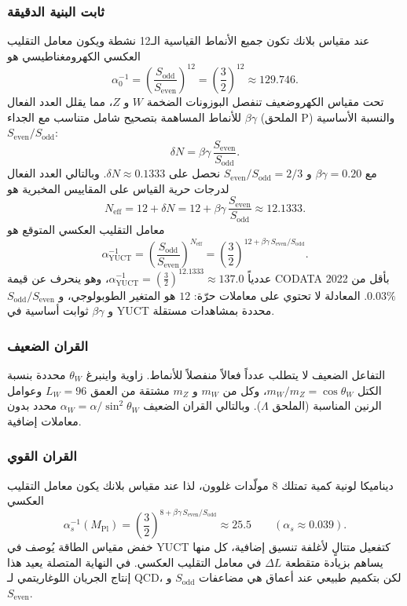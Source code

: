 \documentclass[12pt,a4paper]{article}
\begin{document}
	\subsubsection{ثابت البنية الدقيقة}
	عند مقياس بلانك تكون جميع الأنماط القياسية الـ12 نشطة ويكون معامل التقليب العكسي الكهرومغناطيسي هو
	\[
	\alpha_0^{-1} = \left(\frac{S_{\mathrm{odd}}}{S_{\mathrm{even}}}\right)^{12} = \left(\frac{3}{2}\right)^{12} \approx 129.746 .
	\]
	تحت مقياس الكهروضعيف تنفصل البوزونات الضخمة \(W\) و \(Z\)، مما يقلل العدد الفعال للأنماط المساهمة بتصحيح شامل متناسب مع الجداء \(\beta\gamma\) (الملحق P) والنسبة الأساسية \(S_{\mathrm{even}}/S_{\mathrm{odd}}\):
	\[
	\delta N = \beta\gamma\,\frac{S_{\mathrm{even}}}{S_{\mathrm{odd}}}.
	\]
	مع \(\beta\gamma = 0.20\) و \(S_{\mathrm{even}}/S_{\mathrm{odd}} = 2/3\) نحصل على \(\delta N \approx 0.1333\). وبالتالي العدد الفعال لدرجات حرية القياس على المقاييس المخبرية هو
	\[
	N_{\mathrm{eff}} = 12 + \delta N = 12 + \beta\gamma\,\frac{S_{\mathrm{even}}}{S_{\mathrm{odd}}} \approx 12.1333 .
	\]
	معامل التقليب العكسي المتوقع هو
	\[
	\boxed{\alpha^{-1}_{\mathrm{YUCT}} = \left(\frac{S_{\mathrm{odd}}}{S_{\mathrm{even}}}\right)^{N_{\mathrm{eff}}}
		= \left(\frac{3}{2}\right)^{12 + \beta\gamma\,S_{\mathrm{even}}/S_{\mathrm{odd}}} } .
	\]
	عددياً \(\alpha^{-1}_{\mathrm{YUCT}} = \left(\frac{3}{2}\right)^{12.1333} \approx 137.0\)، وهو ينحرف عن قيمة CODATA 2022 بأقل من \(0.03\%\). المعادلة لا تحتوي على معاملات حرّة: \(12\) هو المتغير الطوبولوجي، و \(S_{\mathrm{odd}}/S_{\mathrm{even}}\) و \(\beta\gamma\) ثوابت أساسية في YUCT محددة بمشاهدات مستقلة.
	
	\subsubsection{القران الضعيف}
	التفاعل الضعيف لا يتطلب عدداً فعالاً منفصلاً للأنماط. زاوية واينبرغ \(\theta_W\) محددة بنسبة الكتل \(m_W/m_Z = \cos\theta_W\)، وكل من \(m_W\) و \(m_Z\) مشتقة من العمق \(L_W = 96\) وعوامل الرنين المناسبة (الملحق \(\Lambda\)). وبالتالي القران الضعيف \(\alpha_W = \alpha/\sin^2\theta_W\) محدد بدون معاملات إضافية.
	
	\subsubsection{القران القوي}
	ديناميكا لونية كمية تمتلك 8 مولّدات غلوون، لذا عند مقياس بلانك يكون معامل التقليب العكسي
	\[
	\alpha_s^{-1}(M_{\mathrm{Pl}}) = \left(\frac{3}{2}\right)^{8 + \beta\gamma\,S_{\mathrm{even}}/S_{\mathrm{odd}}} \approx 25.5 \qquad (\alpha_s \approx 0.039) .
	\]
	خفض مقياس الطاقة يُوصف في YUCT كتفعيل متتالٍ لأغلفة تنسيق إضافية، كل منها يساهم بزيادة متقطعة \(\Delta L\) في معامل التقليب العكسي. في النهاية المتصلة يعيد هذا إنتاج الجريان اللوغاريتمي لـ QCD، لكن بتكميم طبيعي عند أعماق هي مضاعفات \(S_{\mathrm{odd}}\) و \(S_{\mathrm{even}}\).
	
\end{document}

